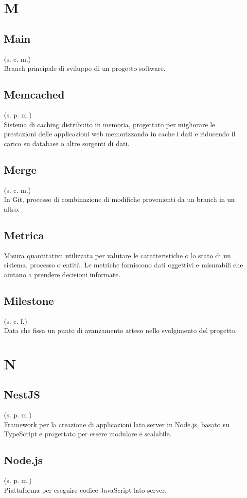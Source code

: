 \section{M}
\subsection{Main}
(s. c. m.)\\
Branch principale di sviluppo di un progetto software.
\subsection{Memcached}
(s. p. m.)\\
Sistema di caching distribuito in memoria, progettato per migliorare le prestazioni
delle applicazioni web memorizzando in cache i dati e riducendo il carico su database
o altre sorgenti di dati.
\subsection{Merge}
(s. c. m.)\\
In Git, processo di combinazione di modifiche provenienti da un branch in un altro.
\subsection{Metrica}
Misura quantitativa utilizzata per valutare le caratteristiche o lo stato di un
sistema, processo o entità. Le metriche forniscono dati oggettivi e misurabili
che aiutano a prendere decisioni informate.
\subsection{Milestone}
(s. c. f.)\\
Data che fissa un punto di avanzamento atteso nello svolgimento del progetto.
\pagebreak
\section{N}
\subsection{NestJS}
(s. p. m.)\\
Framework per la creazione di applicazioni lato server in Node.js,
basato su TypeScript e progettato per essere modulare e scalabile.
\subsection{Node.js}
(s. p. m.)\\
Piattaforma per eseguire codice JavaScript lato server.
\pagebreak
